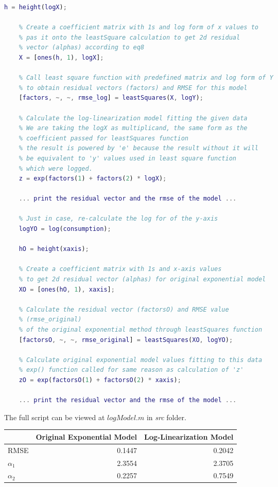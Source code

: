 \documentclass[unicode,11pt,a4paper,oneside,numbers=endperiod,openany]{scrartcl}
\begin{document}
\begin{enumerate}[label=(\alph*)]
\begin{lstlisting}[language=Matlab]
    h = height(logX);
    
    % Create a coefficient matrix with 1s and log form of x values to  
    % pas it onto the leastSquare calculation to get 2d residual 
    % vector (alphas) according to eq8
    X = [ones(h, 1), logX];
    
    % Call least square function with predefined matrix and log form of Y
    % to obtain residual vectors (factors) and RMSE for this model
    [factors, ~, ~, rmse_log] = leastSquares(X, logY);
    
    % Calculate the log-linearization model fitting the given data
    % We are taking the logX as multiplicand, the same form as the 
    % coefficient passed for leastSquares function
    % the result is powered by 'e' because the result without it will
    % be equivalent to 'y' values used in least square function
    % which were logged.
    z = exp(factors(1) + factors(2) * logX);
    
    ... print the residual vector and the rmse of the model ...
    
    % Just in case, re-calculate the log for of the y-axis
    logYO = log(consumption);

    hO = height(xaxis);
    
    % Create a coefficient matrix with 1s and x-axis values
    % to get 2d residual vector (alphas) for original exponential model
    XO = [ones(hO, 1), xaxis];
    
    % Calculate the residual vector (factorsO) and RMSE value
    % (rmse_original)
    % of the original exponential method through leastSquares function
    [factorsO, ~, ~, rmse_original] = leastSquares(XO, logYO);
    
    % Calculate original exponential model values fitting to this data
    % exp() function called for same reason as calculation of 'z'
    zO = exp(factorsO(1) + factorsO(2) * xaxis);
    
    ... print the residual vector and the rmse of the model ...
\end{lstlisting}

The full script can be viewed at ${logModel.m}$ in \textit{src} folder. 

\begin{center}
\begin{tabular}{|l|r|r|} \hline
  & Original Exponential Model & Log-Linearization Model \\
\hline
  RMSE & 0.1447  & 0.2042 \\
\hline
  ${\alpha_1}$ & 2.3554 & 2.3705 \\
\hline
  ${\alpha_2}$ & 0.2257 & 0.7549 \\
\hline
\end{tabular}
\end{center}


\end{enumerate}
\end{document}
